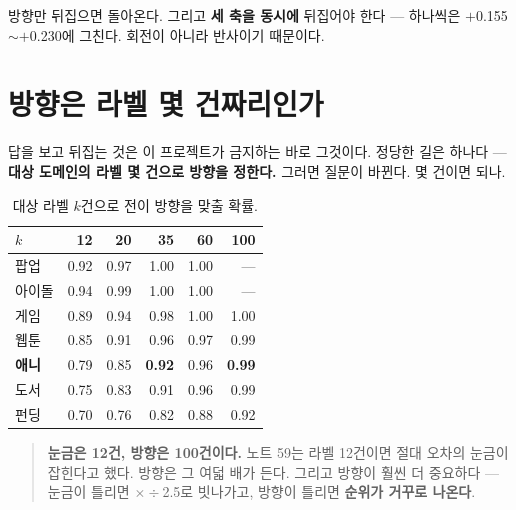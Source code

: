 \documentclass[10pt]{article}
\begin{document}
방향만 뒤집으면 돌아온다. 그리고 \textbf{세 축을 동시에} 뒤집어야 한다 ---
하나씩은 $+$0.155$\sim+$0.230에 그친다. 회전이 아니라 반사이기 때문이다.


\section{방향은 라벨 몇 건짜리인가}

답을 보고 뒤집는 것은 이 프로젝트가 금지하는 바로 그것이다. 정당한 길은 하나다
--- \textbf{대상 도메인의 라벨 몇 건으로 방향을 정한다.} 그러면 질문이 바뀐다.
몇 건이면 되나.

\begin{table}[t]
\centering\tsize
\caption{대상 라벨 $k$건으로 전이 방향을 맞출 확률.}
\begin{tabular}{lrrrrr}
\toprule
$k$ & 12 & 20 & 35 & 60 & 100 \\
\midrule
팝업 & 0.92 & 0.97 & 1.00 & 1.00 & --- \\
아이돌 & 0.94 & 0.99 & 1.00 & 1.00 & --- \\
게임 & 0.89 & 0.94 & 0.98 & 1.00 & 1.00 \\
웹툰 & 0.85 & 0.91 & 0.96 & 0.97 & 0.99 \\
\textbf{애니} & 0.79 & 0.85 & \textbf{0.92} & 0.96 & \textbf{0.99} \\
도서 & 0.75 & 0.83 & 0.91 & 0.96 & 0.99 \\
펀딩 & 0.70 & 0.76 & 0.82 & 0.88 & 0.92 \\
\bottomrule
\end{tabular}
\end{table}

\begin{quote}\fontsize{9.5}{11.5}\selectfont
\textbf{눈금은 12건, 방향은 100건이다.} 노트 59는 라벨 12건이면 절대 오차의
눈금이 잡힌다고 했다. 방향은 그 여덟 배가 든다. 그리고 방향이 훨씬 더 중요하다
--- 눈금이 틀리면 $\times\div$2.5로 빗나가고, 방향이 틀리면 \textbf{순위가
거꾸로 나온다}.
\end{quote}

\end{document}
